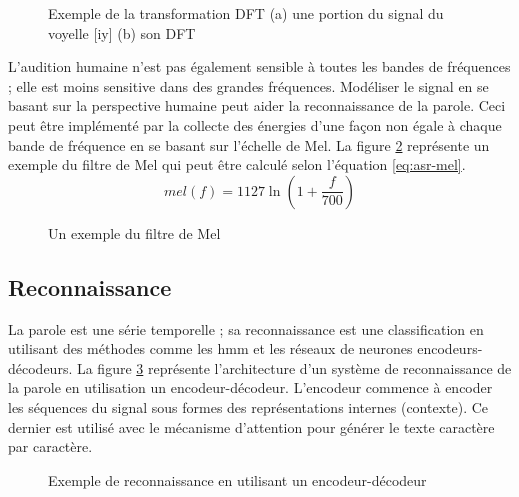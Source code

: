 \documentclass{KodeBook}
\begin{document}
\begin{figure}[!ht]
	\centering
	\caption[Exemple de la transformation DFT]{Exemple de la transformation DFT (a) une portion du signal du voyelle [iy] (b) son DFT \cite{2020-jurafsky-martin}}
	\label{fig:asr-dft-exp}
\end{figure}

L'audition humaine n'est pas également sensible à toutes les bandes de fréquences ; elle est moins sensitive dans des grandes fréquences.
Modéliser le signal en se basant sur la perspective humaine peut aider la reconnaissance de la parole. 
Ceci peut être implémenté par la collecte des énergies d'une façon non égale à chaque bande de fréquence en se basant sur l'échelle de Mel. 
La figure \ref{fig:asr-mel} représente un exemple du filtre de Mel qui peut être calculé selon l'équation \ref{eq:asr-mel}.
\begin{equation}\label{eq:asr-mel}
mel(f) = 1127 \ln (1 + \frac{f}{700})
\end{equation}

\begin{figure}[!ht]
	\centering
	\caption{Un exemple du filtre de Mel \cite{2020-jurafsky-martin}}
	\label{fig:asr-mel}
\end{figure}

\subsection{Reconnaissance}

La parole  est une série temporelle ; sa reconnaissance est une classification en utilisant des méthodes comme les \ac{hmm} et les réseaux de neurones encodeurs-décodeurs.
La figure \ref{fig:asr-enc-dec} représente l'architecture d'un système de reconnaissance de la parole en utilisation un encodeur-décodeur. 
L'encodeur commence à encoder les séquences du signal sous formes des représentations internes (contexte). 
Ce dernier est utilisé avec le mécanisme d'attention pour générer le texte caractère par caractère.

\begin{figure}[!ht]
	\centering
	\caption{Exemple de reconnaissance en utilisant un encodeur-décodeur \cite{2020-jurafsky-martin}}
	\label{fig:asr-enc-dec}
\end{figure}
\end{document}
